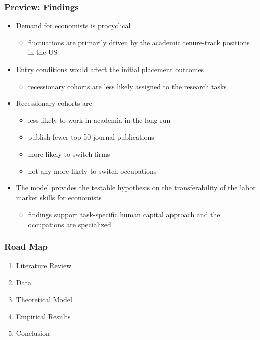 \documentclass[11pt]{beamer}
\begin{document}
\begin{frame}
	\frametitle{Preview: Findings}
	\begin{itemize}
			\item Demand for economists is procyclical
			\begin{itemize}
				\item fluctuations are primarily driven by the academic tenure-track positions in the US
			\end{itemize}
			\vspace{1mm}
			\item Entry conditions would affect the initial placement outcomes
			\begin{itemize}
				\item  recessionary cohorts are less likely assigned to the research tasks
			\end{itemize}
			\vspace{1mm}
			\item Recessionary cohorts are 
			\begin{itemize}
				\item less likely to work in academia in the long run
				\item publish fewer top 50 journal publications
				\item more likely to switch firms
				\item not any more likely to switch occupations
			\end{itemize}
%			
\vspace{1mm}
\item The model provides the testable hypothesis on the transferability of the labor market skills for economists 
			\begin{itemize}
				\item findings support task-specific human capital approach and the occupations are specialized
			\end{itemize}
	\end{itemize}
\end{frame}


\begin{frame}
	\frametitle{Road Map}
\begin{enumerate}
	\item Literature Review
	\vspace{2.6 mm}
	\item Data
	\vspace{2.6 mm}
	\item Theoretical Model
	\vspace{2.6 mm}  
	\item Empirical Results
	\vspace{2.6 mm}  
	\item Conclusion
\end{enumerate}

\end{frame}
\end{document}
